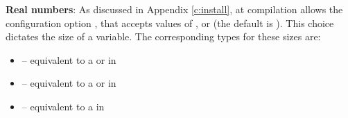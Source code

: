 \textbf{Real numbers}:  As discussed in Appendix \ref{c:install}, at compilation
{\sundials} allows the configuration option ,
that accepts values of ,  or  (the
default is ).  This choice dictates the size of a
 variable.  The corresponding {\F} types for these
 sizes are:
\begin{itemize}
\item {} 
 -- equivalent to a  or  in {\F}

\item {} 
 -- equivalent to a  or  in {\F}

\item {} 
 -- equivalent to a  in {\F}

\end{itemize}

